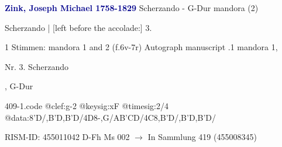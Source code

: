 \documentclass[twocolumn]{book}
\begin{document}
\newline \par \vspace{7pt} \textcolor{darkblue}{\textbf{Zink, Joseph Michael  1758-1829}}
\newline Scherzando - G-Dur
\newline mandora (2)
\newline \begin{itshape} Scherzando | [left before the accolade:] 3.\end{itshape} 
\newline \textcolor{darkblue}{}  1 Stimmen: mandora 1 and 2  (f.6v-7r)
\newline Autograph manuscript
.1  mandora 1, \begin{itshape}Nr. 3. Scherzando\end{itshape}, G-Dur  
\begin{filecontents*}{409-1.code}
@clef:g-2
@keysig:xF
@timesig:2/4
@data:8'D/,B'D,B'D/4D8-,G/AB'CD/4C8,B'D/,B'D,B'D/
\end{filecontents*}
\newline
%
\newline RISM-ID: 455011042
\newline D-Fh  Ms 002
\newline $\rightarrow$ In Sammlung 419 (455008345)
      
\end{document}
